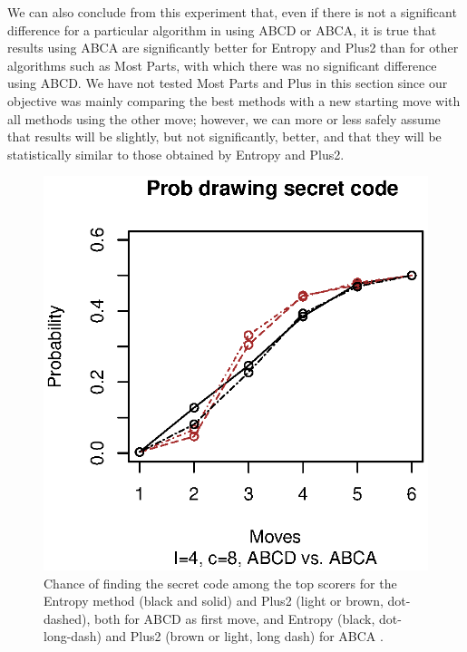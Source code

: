 \documentclass[preprint,12pt]{elsarticle}
\begin{document}
We can also conclude from this experiment that, even if there is not a
significant difference for a particular algorithm in using ABCD or
ABCA, it is true that results using ABCA are significantly better for
Entropy and Plus2 than for other algorithms such as Most Parts, with
which there was no significant difference using ABCD. We have not
tested Most Parts and Plus in this section since our objective was
mainly comparing the best methods with a new starting move with all
methods using the other move; however, we can more or less safely
assume that results will be slightly, but not significantly, better,
and that they will be statistically similar to those obtained by
Entropy and Plus2. 
%
\begin{figure}[!htb]
\centering
\includegraphics{prob-abca-48.eps}
\caption{Chance of finding the secret code among the top scorers for the
  Entropy method (black and solid) and Plus2 (light or
  brown, dot-dashed), both for ABCD as first move, and Entropy (black,
  dot-long-dash) and Plus2 (brown or light, long dash) for ABCA .\label{fig:prob:abca:48}} 
\end{figure} 
%
\end{document}
